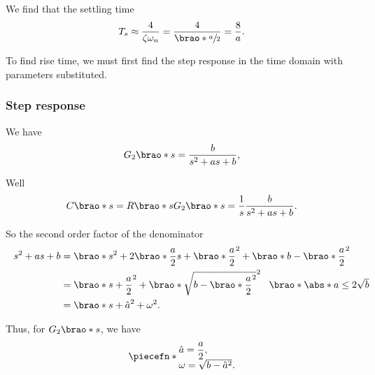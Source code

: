 \documentclass[12pt]{article}
\DeclarePairedDelimiter\brao()%
\DeclarePairedDelimiter\abs||
\DeclarePairedDelimiter\piecefn\{.
\begin{document}
\begin{enumerate}[(a)]
        We find that the settling time
        \begin{equation}\label{eq:settling time}
            T_s \approx \frac4{\zeta\omega_n} = \frac4{\brao*{\sfrac{a}2}} = \frac8a.
        \end{equation}

        To find rise time, we must first find the step response in the time domain with parameters substituted.

        \subsubsection{Step response}
        We have
        \[
            G_2\brao*s = \frac{b}{s^2 + as + b},
        \]

        Well
        \begin{equation}
            C\brao*s = R\brao*s G_2\brao*s = \frac1s \frac{b}{s^2 + as + b}.
        \end{equation}

        So the second order factor of the denominator
        \begin{equation}\label{eq:sum of squares}
            \begin{aligned}
                s^2 + as + b
                &{} = \brao*{s^2 + 2\brao*{\frac{a}2}s + \brao*{\frac{a}2}^2} + \brao*{b - \brao*{\frac{a}2}^2}
            \\*
                &{} = \brao*{s + \frac{a}2}^2 + \brao*{\sqrt{b - \brao*{\frac{a}2}^2}}^2
                \rlap{
                    $\hskip0.5em\brao*{\abs*{a} \leq 2\sqrt{b}}$
                }
            \\*
                &{}= \brao*{s + \hat{a}}^2 + \omega^2.
            \\*
            \end{aligned}
        \end{equation}

        Thus, for $G_2\brao*s$, we have
        \begin{equation}\label{eq:Laplace constants}
            \piecefn*{
                \begin{array}{@{}l@{}}
                    \displaystyle
                    \hat{a} = \frac{a}2, \\*
                    \omega = \sqrt{b - \hat{a}^2}. \\*
                \end{array}
            }
        \end{equation}


\end{enumerate}
\end{document}
